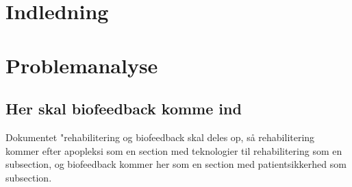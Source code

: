 
\usepackage{marvosym}





\frontmatter




 

 \cleardoublepage

\tableofcontents*

\mainmatter
\chapter{Indledning}



\chapter{Problemanalyse}







\section{Her skal biofeedback komme ind} 
Dokumentet "rehabilitering og biofeedback skal deles op, så rehabilitering kommer efter apopleksi som en section med teknologier til rehabilitering som en subsection, og biofeedback kommer her som en section med patientsikkerhed som subsection.

